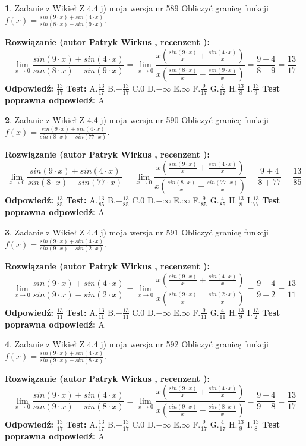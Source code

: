 \documentclass[12pt, a4paper]{article}
\theoremstyle{definition} %
\newtheorem{zad}{}
\newcommand{\zadStart}[1]{\begin{zad}#1\newline}
\newcommand{\zadStop}{\end{zad}}
\newcommand{\rozwStart}[2]{\noindent \textbf{Rozwiązanie (autor #1 , recenzent #2): }\newline}
\newcommand{\rozwStop}{\newline}
\newcommand{\odpStart}{\noindent \textbf{Odpowiedź:}\newline}
\newcommand{\odpStop}{\newline}
\newcommand{\testStart}{\noindent \textbf{Test:}\newline}
\newcommand{\testStop}{\newline}
\newcommand{\kluczStart}{\noindent \textbf{Test poprawna odpowiedź:}\newline}
\newcommand{\kluczStop}{\newline}
\begin{document}
\zadStart{Zadanie z Wikieł Z 4.4 j) moja wersja nr 589}
Obliczyć granicę funkcji $f(x)=\frac{sin(9\cdot x) +sin(4\cdot x)}{sin(8\cdot x) -sin(9\cdot x)}$.
\zadStop
\rozwStart{Patryk Wirkus}{}
$$\lim\limits_{x\to 0}\frac{sin(9\cdot x) +sin(4\cdot x)}{sin(8\cdot x) -sin(9\cdot x)}=\lim\limits_{x\to 0}\frac{x(\frac{sin(9\cdot x)}{x}+\frac{sin(4\cdot x)}{x})}{x(\frac{sin(8\cdot x)}{x}-\frac{sin(9\cdot x)}{x})}=\frac{9+4}{8+9} = \frac{13}{17}$$
\rozwStop
\odpStart
$\frac{13}{17}$
\odpStop
\testStart
A.$\frac{13}{17}$
B.$-\frac{13}{17}$
C.$0$
D.$-\infty$
E.$\infty$
F.$\frac{9}{17}$
G.$\frac{4}{17}$
H.$\frac{13}{8}$
I.$\frac{13}{9}$
\testStop
\kluczStart
A
\kluczStop



\zadStart{Zadanie z Wikieł Z 4.4 j) moja wersja nr 590}
Obliczyć granicę funkcji $f(x)=\frac{sin(9\cdot x) +sin(4\cdot x)}{sin(8\cdot x) -sin(77\cdot x)}$.
\zadStop
\rozwStart{Patryk Wirkus}{}
$$\lim\limits_{x\to 0}\frac{sin(9\cdot x) +sin(4\cdot x)}{sin(8\cdot x) -sin(77\cdot x)}=\lim\limits_{x\to 0}\frac{x(\frac{sin(9\cdot x)}{x}+\frac{sin(4\cdot x)}{x})}{x(\frac{sin(8\cdot x)}{x}-\frac{sin(77\cdot x)}{x})}=\frac{9+4}{8+77} = \frac{13}{85}$$
\rozwStop
\odpStart
$\frac{13}{85}$
\odpStop
\testStart
A.$\frac{13}{85}$
B.$-\frac{13}{85}$
C.$0$
D.$-\infty$
E.$\infty$
F.$\frac{9}{85}$
G.$\frac{4}{85}$
H.$\frac{13}{8}$
I.$\frac{13}{77}$
\testStop
\kluczStart
A
\kluczStop



\zadStart{Zadanie z Wikieł Z 4.4 j) moja wersja nr 591}
Obliczyć granicę funkcji $f(x)=\frac{sin(9\cdot x) +sin(4\cdot x)}{sin(9\cdot x) -sin(2\cdot x)}$.
\zadStop
\rozwStart{Patryk Wirkus}{}
$$\lim\limits_{x\to 0}\frac{sin(9\cdot x) +sin(4\cdot x)}{sin(9\cdot x) -sin(2\cdot x)}=\lim\limits_{x\to 0}\frac{x(\frac{sin(9\cdot x)}{x}+\frac{sin(4\cdot x)}{x})}{x(\frac{sin(9\cdot x)}{x}-\frac{sin(2\cdot x)}{x})}=\frac{9+4}{9+2} = \frac{13}{11}$$
\rozwStop
\odpStart
$\frac{13}{11}$
\odpStop
\testStart
A.$\frac{13}{11}$
B.$-\frac{13}{11}$
C.$0$
D.$-\infty$
E.$\infty$
F.$\frac{9}{11}$
G.$\frac{4}{11}$
H.$\frac{13}{9}$
I.$\frac{13}{2}$
\testStop
\kluczStart
A
\kluczStop



\zadStart{Zadanie z Wikieł Z 4.4 j) moja wersja nr 592}
Obliczyć granicę funkcji $f(x)=\frac{sin(9\cdot x) +sin(4\cdot x)}{sin(9\cdot x) -sin(8\cdot x)}$.
\zadStop
\rozwStart{Patryk Wirkus}{}
$$\lim\limits_{x\to 0}\frac{sin(9\cdot x) +sin(4\cdot x)}{sin(9\cdot x) -sin(8\cdot x)}=\lim\limits_{x\to 0}\frac{x(\frac{sin(9\cdot x)}{x}+\frac{sin(4\cdot x)}{x})}{x(\frac{sin(9\cdot x)}{x}-\frac{sin(8\cdot x)}{x})}=\frac{9+4}{9+8} = \frac{13}{17}$$
\rozwStop
\odpStart
$\frac{13}{17}$
\odpStop
\testStart
A.$\frac{13}{17}$
B.$-\frac{13}{17}$
C.$0$
D.$-\infty$
E.$\infty$
F.$\frac{9}{17}$
G.$\frac{4}{17}$
H.$\frac{13}{9}$
I.$\frac{13}{8}$
\testStop
\kluczStart
A
\kluczStop
\end{document}

